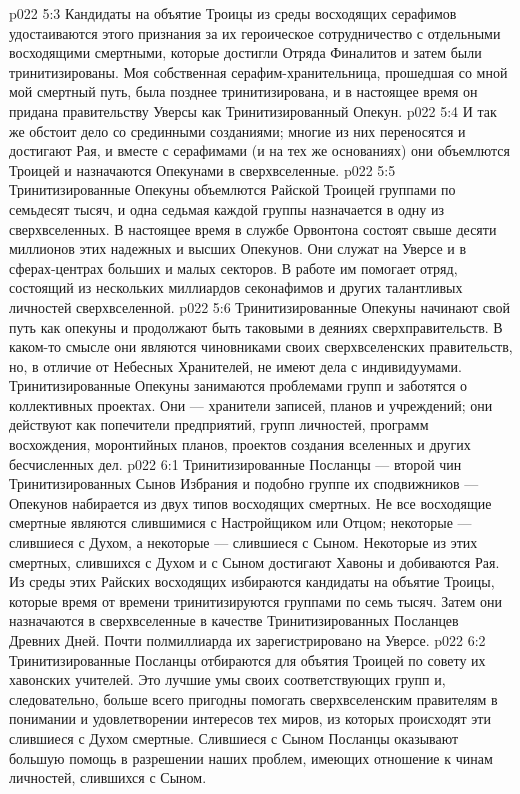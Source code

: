 \vs p022 5:3 Кандидаты на объятие Троицы из среды восходящих серафимов удостаиваются этого признания за их героическое сотрудничество с отдельными восходящими смертными, которые достигли Отряда Финалитов и затем были тринитизированы. Моя собственная серафим\hyp{}хранительница, прошедшая со мной мой смертный путь, была позднее тринитизирована, и в настоящее время он придана правительству Уверсы как Тринитизированный Опекун.
\vs p022 5:4 И так же обстоит дело со срединными созданиями; многие из них переносятся и достигают Рая, и вместе с серафимами (и на тех же основаниях) они объемлются Троицей и назначаются Опекунами в сверхвселенные.
\vs p022 5:5 Тринитизированные Опекуны объемлются Райской Троицей группами по семьдесят тысяч, и одна седьмая каждой группы назначается в одну из сверхвселенных. В настоящее время в службе Орвонтона состоят свыше десяти миллионов этих надежных и высших Опекунов. Они служат на Уверсе и в сферах\hyp{}центрах больших и малых секторов. В работе им помогает отряд, состоящий из нескольких миллиардов секонафимов и других талантливых личностей сверхвселенной.
\vs p022 5:6 Тринитизированные Опекуны начинают свой путь как опекуны и продолжают быть таковыми в деяниях сверхправительств. В каком\hyp{}то смысле они являются чиновниками своих сверхвселенских правительств, но, в отличие от Небесных Хранителей, не имеют дела с индивидуумами. Тринитизированные Опекуны занимаются проблемами групп и заботятся о коллективных проектах. Они --- хранители записей, планов и учреждений; они действуют как попечители предприятий, групп личностей, программ восхождения, моронтийных планов, проектов создания вселенных и других бесчисленных дел.
\vs p022 6:1 Тринитизированные Посланцы --- второй чин Тринитизированных Сынов Избрания и подобно группе их сподвижников --- Опекунов набирается из двух типов восходящих смертных. Не все восходящие смертные являются слившимися с Настройщиком или Отцом; некоторые --- слившиеся с Духом, а некоторые --- слившиеся с Сыном. Некоторые из этих смертных, слившихся с Духом и с Сыном достигают Хавоны и добиваются Рая. Из среды этих Райских восходящих избираются кандидаты на объятие Троицы, которые время от времени тринитизируются группами по семь тысяч. Затем они назначаются в сверхвселенные в качестве Тринитизированных Посланцев Древних Дней. Почти полмиллиарда их зарегистрировано на Уверсе.
\vs p022 6:2 Тринитизированные Посланцы отбираются для объятия Троицей по совету их хавонских учителей. Это лучшие умы своих соответствующих групп и, следовательно, больше всего пригодны помогать сверхвселенским правителям в понимании и удовлетворении интересов тех миров, из которых происходят эти слившиеся с Духом смертные. Слившиеся с Сыном Посланцы оказывают большую помощь в разрешении наших проблем, имеющих отношение к чинам личностей, слившихся с Сыном.
